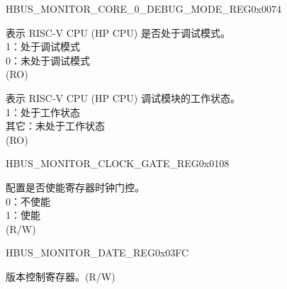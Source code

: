 \begin{register}{H}{BUS\_MONITOR\_CORE\_0\_DEBUG\_MODE\_REG}{0x0074}\label{regdesc:BUSMONITORCORE0DEBUGMODEREG}
%
%
%
\regnewline%
\begin{regdesc}\begin{reglist}
\label{fielddesc:BUSMONITORCORE0DEBUGMODE}\item [BUS\_MONITOR\_CORE\_0\_DEBUG\_MODE] 表示 RISC-V CPU (HP CPU) 是否处于调试模式。\\
1：处于调试模式\\
0：未处于调试模式\\
(RO)
\label{fielddesc:BUSMONITORCORE0DEBUGMODULEACTIVE}\item [BUS\_MONITOR\_CORE\_0\_DEBUG\_MODULE\_ACTIVE] 表示 RISC-V CPU (HP CPU) 调试模块的工作状态。\\
1：处于工作状态\\
其它：未处于工作状态\\
(RO)
\end{reglist}\end{regdesc}
\end{register}


\begin{register}{H}{BUS\_MONITOR\_CLOCK\_GATE\_REG}{0x0108}\label{regdesc:BUSMONITORCLOCKGATEREG}
%
%
\regnewline%
\begin{regdesc}\begin{reglist}
\label{fielddesc:BUSMONITORCLKEN}\item [BUS\_MONITOR\_CLK\_EN] 配置是否使能寄存器时钟门控。\\
0：不使能\\
1：使能\\
(R/W)
\end{reglist}\end{regdesc}
\end{register}


\begin{register}{H}{BUS\_MONITOR\_DATE\_REG}{0x03FC}\label{regdesc:BUSMONITORDATEREG}
%
%
\regnewline%
\begin{regdesc}\begin{reglist}
\label{fielddesc:BUSMONITORDATE}\item [BUS\_MONITOR\_DATE] 版本控制寄存器。(R/W)
\end{reglist}\end{regdesc}
\end{register}
